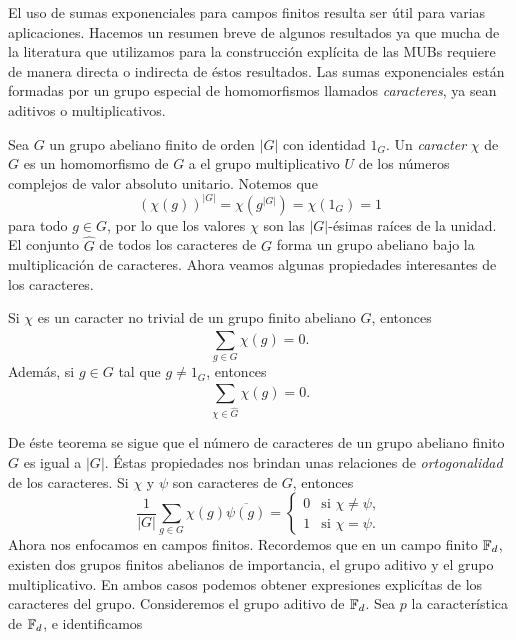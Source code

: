 El uso de sumas exponenciales para campos finitos resulta
ser útil para varias aplicaciones. Hacemos un resumen breve
de algunos resultados ya que mucha de la literatura que
utilizamos para la construcción explícita de las MUBs
requiere de manera directa o indirecta de éstos resultados.
Las sumas exponenciales están formadas por un grupo especial
de homomorfismos llamados \textit{caracteres}, ya sean
aditivos o multiplicativos.

Sea $G$ un grupo abeliano finito de orden $|G|$ con
identidad $1_G$. Un \textit{caracter} $\chi$ de $G$ es un
homomorfismo de $G$ a el grupo multiplicativo $U$ de los
números complejos de valor absoluto unitario. Notemos que
\[
  \left( \chi(g) \right)^{|G|}
  = \chi\left( g^{|G|} \right) 
  = \chi\left( 1_G \right) 
  = 1
\] 
para todo $g \in G$, por lo que los valores $\chi$ son las
$|G|$-ésimas raíces de la unidad. El conjunto $\hat G$ de
todos los caracteres de $G$ forma un grupo abeliano bajo la
multiplicación de caracteres. Ahora veamos algunas
propiedades interesantes de los caracteres.
\begin{theorem}
  Si $\chi$ es un caracter no trivial de un grupo finito
  abeliano $G$, entonces
  \begin{equation}
    \sum_{g \in G}^{} \chi(g) = 0.
  \end{equation}
  Además, si $g \in G$ tal que $g \neq 1_G$, entonces
  \begin{equation}
    \sum_{\chi \in \hat G}^{} \chi(g) = 0.
  \end{equation}
\end{theorem}
De éste teorema se sigue que el número de caracteres de un
grupo abeliano finito $G$ es igual a $|G|$. Éstas
propiedades nos brindan unas relaciones de
\textit{ortogonalidad} de los caracteres. Si $\chi$ y $\psi$
son caracteres de $G$, entonces
\begin{equation}
  \frac{1}{|G|}
  \sum_{g \in G}^{} \chi(g) \overline{\psi(g)}
  = \begin{cases}
    0 & \text{si } \chi \neq \psi, \\
    1 & \text{si } \chi = \psi.
  \end{cases}
\end{equation}
Ahora nos enfocamos en campos finitos. Recordemos que en un
campo finito $\operatorname{\mathbb{F}}_d$, existen dos grupos finitos abelianos de
importancia, el grupo aditivo y el grupo multiplicativo. En
ambos casos podemos obtener expresiones explicítas de los
caracteres del grupo. Consideremos el grupo aditivo de
$\operatorname{\mathbb{F}}_d$. Sea $p$ la característica de $\operatorname{\mathbb{F}}_d$, e identificamos
